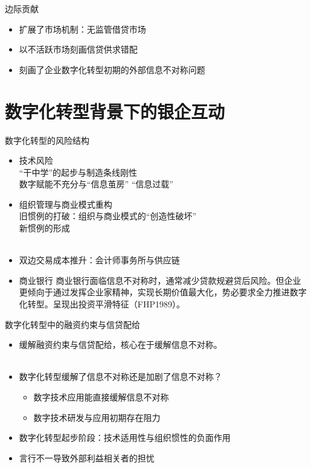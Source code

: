 \documentclass{beamer}
\begin{document}
\begin{frame}{边际贡献}
	\begin{itemize}
		\item 扩展了市场机制：无监管借贷市场
		\item 以不活跃市场刻画信贷供求错配
		\item 刻画了企业数字化转型初期的外部信息不对称问题
	\end{itemize}
	
	
\end{frame}

\section{数字化转型背景下的银企互动}

\begin{frame}{数字化转型的风险结构}
	\begin{itemize}
		\item 技术风险\\
		“干中学”的起步与制造条线刚性\\
		数字赋能不充分与“信息茧房” “信息过载”\\
		\item 组织管理与商业模式重构\\
		旧惯例的打破：组织与商业模式的“创造性破坏”\\
		新惯例的形成\\~\\
		\item 双边交易成本推升：会计师事务所与供应链
		\item 商业银行
		商业银行面临信息不对称时，通常减少贷款规避贷后风险。但企业更倾向于通过发挥企业家精神，实现长期价值最大化，势必要求全力推进数字化转型。呈现出投资平滑特征（FHP1989）。
	\end{itemize}
\end{frame}


\begin{frame}{数字化转型中的融资约束与信贷配给}
	\begin{itemize}
		\item 缓解融资约束与信贷配给，核心在于缓解信息不对称。\\~\\
		\item 数字化转型缓解了信息不对称还是加剧了信息不对称？
		\begin{itemize}
			\item[] 数字技术应用能直接缓解信息不对称
			\item[] 数字技术研发与应用初期存在阻力
		\end{itemize}

		\item 数字化转型起步阶段：技术适用性与组织惯性的负面作用
		\item 言行不一导致外部利益相关者的担忧
	\end{itemize}
\end{frame}
\end{document}
